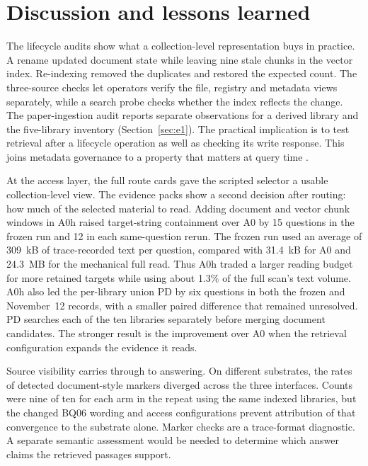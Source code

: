 \section{Discussion and lessons learned}
\label{sec:discussion}

The lifecycle audits show what a collection-level representation buys in
practice. A rename updated document state while leaving nine stale chunks
in the vector index. Re-indexing removed the duplicates and restored the
expected count. The three-source checks let operators verify the file,
registry and metadata views separately, while a search probe checks whether
the index reflects the change. The paper-ingestion audit reports separate
observations for a derived library and the five-library inventory
(Section~\ref{sec:e1}). The practical implication is to
test retrieval after a lifecycle operation as well as checking its write
response. This joins metadata governance to a property that matters at
query time \citep{park-metadata-quality-2009,paivarinta-ecm-2005}.

At the access layer, the full route cards gave the scripted selector a
usable collection-level view. The evidence packs show a second decision
after routing: how much of the selected material to read. Adding document
and vector chunk windows in A0h raised target-string containment over A0 by
15 questions in the frozen run and 12 in each same-question rerun. The
frozen run used an average of 309~kB of trace-recorded text per question,
compared with 31.4~kB for A0 and 24.3~MB for the mechanical full read. Thus
A0h traded a larger reading budget for more retained targets while using
about 1.3\% of the full scan's text volume. A0h also led the per-library
union PD by six questions in both the frozen and November~12 records, with a smaller paired difference
that remained unresolved. PD searches each of the ten libraries separately
before merging document candidates. The stronger result is the improvement over A0
when the retrieval configuration expands the evidence it reads.

Source visibility carries through to answering. On different substrates,
the rates of detected document-style markers diverged across the three
interfaces. Counts were nine of ten for each arm in the repeat using the same
indexed libraries, but the changed BQ06 wording and access configurations
prevent attribution of that convergence to the substrate alone. Marker checks are a
trace-format diagnostic. A separate semantic assessment would be needed to
determine which answer claims the retrieved passages support.

